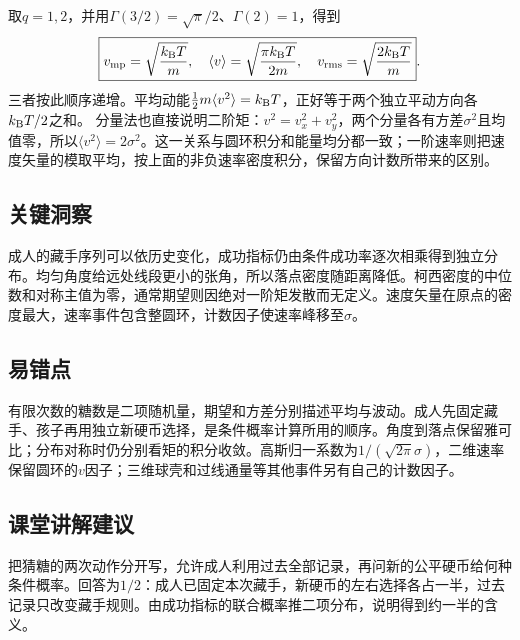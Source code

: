 \documentclass[UTF8,fontset=fandol,a4paper,11pt]{ctexart}
\begin{document}
取$q=1,2$，并用$\Gamma(3/2)=\sqrt\pi/2$、$\Gamma(2)=1$，得到
\[
\boxed{v_{\rm mp}=\sqrt{\frac{k_{\rm B}T}{m}},\quad
\langle v\rangle=\sqrt{\frac{\pi k_{\rm B}T}{2m}},\quad
v_{\rm rms}=\sqrt{\frac{2k_{\rm B}T}{m}}}.
\]
三者按此顺序递增。平均动能$\frac12m\langle v^2\rangle=k_{\rm B}T$，正好等于两个独立平动方向各$k_{\rm B}T/2$之和。
分量法也直接说明二阶矩：$v^2=v_x^2+v_y^2$，两个分量各有方差$\sigma^2$且均值零，所以$\langle v^2\rangle=2\sigma^2$。这一关系与圆环积分和能量均分都一致；一阶速率则把速度矢量的模取平均，按上面的非负速率密度积分，保留方向计数所带来的区别。





\subsection*{关键洞察}

成人的藏手序列可以依历史变化，成功指标仍由条件成功率逐次相乘得到独立分布。均匀角度给远处线段更小的张角，所以落点密度随距离降低。柯西密度的中位数和对称主值为零，通常期望则因绝对一阶矩发散而无定义。速度矢量在原点的密度最大，速率事件包含整圆环，计数因子使速率峰移至$\sigma$。



\subsection*{易错点}

有限次数的糖数是二项随机量，期望和方差分别描述平均与波动。成人先固定藏手、孩子再用独立新硬币选择，是条件概率计算所用的顺序。角度到落点保留雅可比；分布对称时仍分别看矩的积分收敛。高斯归一系数为$1/(\sqrt{2\pi}\sigma)$，二维速率保留圆环的$v$因子；三维球壳和过线通量等其他事件另有自己的计数因子。



\subsection*{课堂讲解建议}

把猜糖的两次动作分开写，允许成人利用过去全部记录，再问新的公平硬币给何种条件概率。回答为$1/2$：成人已固定本次藏手，新硬币的左右选择各占一半，过去记录只改变藏手规则。由成功指标的联合概率推二项分布，说明得到约一半的含义。
\end{document}
